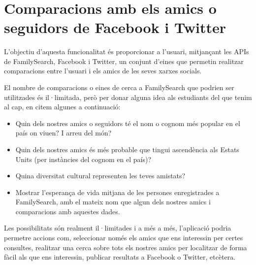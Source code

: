 \section{Comparacions amb els amics o seguidors de Facebook i Twitter}

    \paragraph{}
    L'objectiu d'aquesta funcionalitat és proporcionar a l'usuari, mitjançant les APIs de FamilySearch, Facebook i Twitter, un conjunt d'eines que permetin realitzar comparacions entre l'usuari i els amics de les seves xarxes socials.

    El nombre de comparacions o eines de cerca a FamilySearch que podrien ser utilitzades és il·limitada, però per donar alguna idea als estudiants del que tenim al cap, en citem algunes a continuació:

    \begin{itemize}
        \item Quin dels nostres amics o seguidors té el nom o cognom més popular en el país on viuen? I arreu del món?
        \item Quin dels nostres amics és més probable que tingui ascendència als Estats Units (per instàncies del cognom en el país)?
        \item Quina diversitat cultural representen les teves amistats?
        \item Mostrar l'esperança de vida mitjana de les persones enregistrades a FamilySearch, amb el mateix nom que algun dels nostres amics i comparacions amb aquestes dades.
    \end{itemize}

    Les possibilitats són realment il·limitades i a més a més, l'aplicació podria permetre accions com, seleccionar només els amics que ens interessin per certes consultes, realitzar una cerca sobre tots els nostres amics per localitzar de forma fàcil als que ens interessin, publicar resultats a Facebook o Twitter, etcètera.
